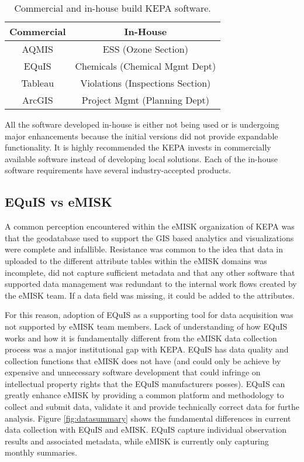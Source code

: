 \begin{table}[H]
\centering
\caption{Commercial and in-house build KEPA software.}
\label{tab:kepasw}
\begin{tabular}{@{}cc@{}}
\toprule
\textbf{Commercial} & \textbf{In-House} \\ \midrule
AQMIS & ESS (Ozone Section) \\
EQuIS & Chemicals (Chemical Mgmt Dept) \\
Tableau & Violations (Inspections Section) \\
ArcGIS & Project Mgmt (Planning Dept) \\ \bottomrule
\end{tabular}
\end{table}

All the software developed in-house is either not being used or is undergoing major enhancements because the initial versions did not provide expandable functionality. It is highly recommended the KEPA invests in commercially available software instead of developing local solutions. Each of the in-house software requirements have several industry-accepted products.

\subsection{EQuIS vs eMISK}

A common perception encountered within the eMISK organization of KEPA was that the geodatabase used to support the GIS based analytics and visualizations were complete and infallible. Resistance was common to the idea that data in uploaded to the different attribute tables within the eMISK domains was incomplete, did not capture sufficient metadata and that any other software that supported data management was redundant to the internal work flows created by the eMISK team. If a data field was missing, it could be added to the attributes.

For this reason, adoption of EQuIS as a supporting tool for data acquisition was not supported by eMISK team members. Lack of understanding of how EQuIS works and how it is fundamentally different from the eMISK data collection process was a major institutional gap with KEPA. EQuIS has data quality and collection functions that eMISK does not have (and could only be achieve by expensive and unnecessary software development that could infringe on intellectual property rights that the EQuIS manufacturers posses).  EQuIS can greatly enhance eMISK by providing a common platform and methodology to collect and submit data, validate it and provide technically correct data for furthe analysis.  Figure \ref{fig:datasummary} shows the fundamental differences in current data collection with EQuIS and eMISK. EQuIS capture individual observation results and associated metadata, while eMISK is currently only capturing monthly summaries.

